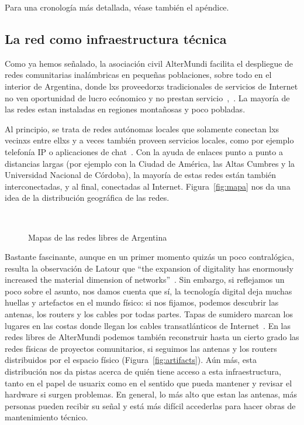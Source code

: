 Para una cronología más detallada, véase también el apéndice.

\subsection{La red como infraestructura técnica}

Como ya hemos señalado, la asociación civil AlterMundi facilita el despliegue de redes comunitarias inalámbricas en pequeñas poblaciones, sobre todo en el interior de Argentina, donde lxs proveedorxs tradicionales de servicios de Internet no ven oportunidad de lucro ecónomico y no prestan servicio~\autocite{Piccoli2015},~\autocite{Vaseva2016a}.
La mayoría de las redes estan instaladas en regiones montañosas y poco pobladas.

Al principio, se trata de redes autónomas locales que solamente conectan lxs vecinxs entre ellxs y a veces también proveen servicios locales, como por ejemplo telefonía IP o aplicaciones de chat~\autocite{Piccoli2015}.
Con la ayuda de enlaces punto a punto a distancias largas (por ejemplo con la Ciudad de América, las Altas Cumbres y la Universidad Nacional de Córdoba), la mayoría de estas redes están también interconectadas, y al final, conectadas al Internet.
Figura~\vref{fig:mapa} nos da una idea de la distribución geográfica de las redes.

\begin{figure}[h]
\centering
{} \\
\caption[mapas]{Mapas de las redes libres de Argentina} %
\label{fig:mapa}
\end{figure}

Bastante fascinante, aunque en un primer momento quizás un poco contralógica, resulta la observación de Latour que ``the expansion of digitality has enormously increased the material dimension of networks''~\autocite{Latour2010}.
Sin embargo, si reflejamos un poco sobre el asunto, nos damos cuenta que sí, la tecnología digital deja muchas huellas y artefactos en el mundo físico: si nos fijamos, podemos descubrir las antenas, los routers y los cables por todas partes.
Tapas de sumidero marcan los lugares en las costas donde llegan los cables transatlánticos de Internet~\autocite{Roth2015}.
En las redes libres de AlterMundi podemos también reconstruir hasta un cierto grado las redes físicas de proyectos comunitarios, si seguimos las antenas y los routers distribuidos por el espacio físico (Figura~\vref{fig:artifacts}).
Aún más, esta distribución nos da pistas acerca de quién tiene acceso a esta infraestructura, tanto en el papel de usuarix como en el sentido que pueda mantener y revisar el hardware si surgen problemas.
En general, lo más alto que estan las antenas, más personas pueden recibir su señal y está más difícil accederlas para hacer obras de mantenimiento técnico.

